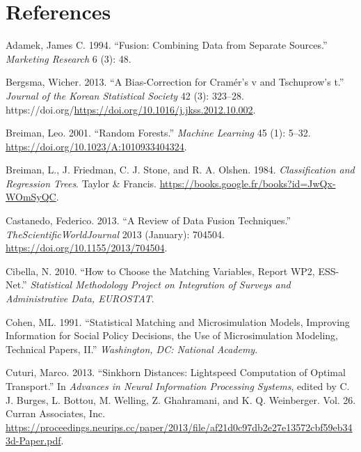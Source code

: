 \hypertarget{references}{%
\section*{References}\label{references}}

\hypertarget{refs}{}
\begin{CSLReferences}{1}{0}
\leavevmode{}%
Adamek, James C. 1994. {``Fusion: Combining Data from Separate Sources.''} \emph{Marketing Research} 6 (3): 48.

\leavevmode{}%
Bergsma, Wicher. 2013. {``A Bias-Correction for Cramér's v and Tschuprow's t.''} \emph{Journal of the Korean Statistical Society} 42 (3): 323--28. https://doi.org/\url{https://doi.org/10.1016/j.jkss.2012.10.002}.

\leavevmode{}%
Breiman, Leo. 2001. {``Random Forests.''} \emph{Machine Learning} 45 (1): 5--32. \url{https://doi.org/10.1023/A:1010933404324}.

\leavevmode{}%
Breiman, L., J. Friedman, C. J. Stone, and R. A. Olshen. 1984. \emph{Classification and Regression Trees}. Taylor \& Francis. \url{https://books.google.fr/books?id=JwQx-WOmSyQC}.

\leavevmode{}%
Castanedo, Federico. 2013. {``A Review of Data Fusion Techniques.''} \emph{TheScientificWorldJournal} 2013 (January): 704504. \url{https://doi.org/10.1155/2013/704504}.

\leavevmode{}%
Cibella, N. 2010. {``How to Choose the Matching Variables, Report WP2, ESS-Net.''} \emph{Statistical Methodology Project on Integration of Surveys and Administrative Data, EUROSTAT}.

\leavevmode{}%
Cohen, ML. 1991. {``Statistical Matching and Microsimulation Models, Improving Information for Social Policy Decisions, the Use of Microsimulation Modeling, Technical Papers, II.''} \emph{Washington, DC: National Academy}.

\leavevmode{}%
Cuturi, Marco. 2013. {``Sinkhorn Distances: Lightspeed Computation of Optimal Transport.''} In \emph{Advances in Neural Information Processing Systems}, edited by C. J. Burges, L. Bottou, M. Welling, Z. Ghahramani, and K. Q. Weinberger. Vol. 26. Curran Associates, Inc. \url{https://proceedings.neurips.cc/paper/2013/file/af21d0c97db2e27e13572cbf59eb343d-Paper.pdf}.


\end{CSLReferences}
